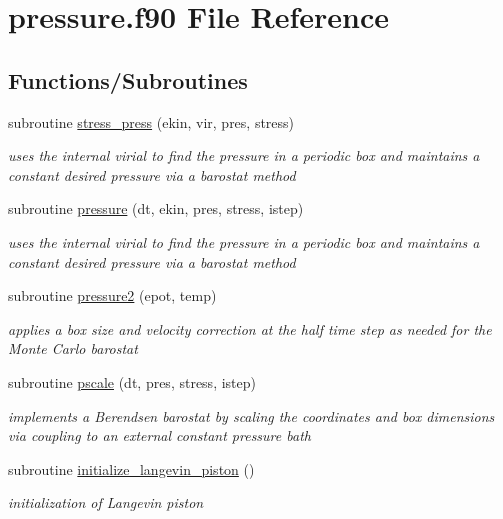 \hypertarget{pressure_8f90}{\section{pressure.\-f90 File Reference}
\label{pressure_8f90}
}
\subsection*{Functions/\-Subroutines}
\begin{DoxyCompactItemize}
\item 
subroutine \hyperlink{pressure_8f90_abbdbe34d36763af8d4b83b836a60c3af}{stress\-\_\-press} (ekin, vir, pres, stress)
\begin{DoxyCompactList}\small\item\em uses the internal virial to find the pressure in a periodic box and maintains a constant desired pressure via a barostat method \end{DoxyCompactList}\item 
subroutine \hyperlink{pressure_8f90_a7d8bdf32501e58b7bf9d4570151536cc}{pressure} (dt, ekin, pres, stress, istep)
\begin{DoxyCompactList}\small\item\em uses the internal virial to find the pressure in a periodic box and maintains a constant desired pressure via a barostat method \end{DoxyCompactList}\item 
subroutine \hyperlink{pressure_8f90_a75fe7016013b0eab5cf778f05aa90315}{pressure2} (epot, temp)
\begin{DoxyCompactList}\small\item\em applies a box size and velocity correction at the half time step as needed for the Monte Carlo barostat \end{DoxyCompactList}\item 
subroutine \hyperlink{pressure_8f90_a310e39d7ba965f458d4878c4ddd396f6}{pscale} (dt, pres, stress, istep)
\begin{DoxyCompactList}\small\item\em implements a Berendsen barostat by scaling the coordinates and box dimensions via coupling to an external constant pressure bath \end{DoxyCompactList}\item 
subroutine \hyperlink{pressure_8f90_a089c0bbf234000e116e0cc5918f94ef0}{initialize\-\_\-langevin\-\_\-piston} ()
\begin{DoxyCompactList}\small\item\em initialization of Langevin piston \end{DoxyCompactList}\item 

\end{DoxyCompactItemize}
